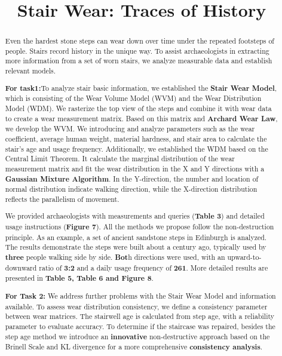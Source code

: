 \documentclass[12pt]{article}  %
\title{Stair Wear: Traces of History}  %
\numberwithin{equation}{section} %
\begin{document}
\begin{abstract}
	Even the hardest stone steps can wear down over time under the repeated footsteps of people. Stairs record history in the unique way. To assist archaeologists in extracting more information from a set of worn stairs, we analyze measurable data and establish relevant models.
	        
    \textbf{For task1:}To analyze stair basic information, we established the \textbf{Stair Wear Model}, which is consisting of the Wear Volume Model (WVM) and the Wear Distribution Model (WDM). We rasterize the top view of the steps and combine it with wear data to create a wear measurement matrix. Based on this matrix and \textbf{Archard Wear Law}, we develop the WVM. We introducing and analyze parameters such as the wear coefficient, average human weight, material hardness, and stair area to calculate the stair's age and usage frequency. Additionally, we established the WDM based on the Central Limit Theorem. It calculate the marginal distribution of the wear measurement matrix and fit the wear distribution in the X and Y directions with a \textbf{Gaussian Mixture Algorithm}. In the Y-direction, the number and location of normal distribution indicate walking direction, while the X-direction distribution reflects the parallelism of movement.

    We provided archaeologists with measurements and queries (\textbf{Table 3}) and detailed usage instructions (\textbf{Figure 7}). All the methods we propose follow the non-destruction principle. As an example, a set of ancient sandstone steps in Edinburgh is analyzed. The results demonstrate the steps were built about a century ago, typically used by \textbf{three} people walking side by side. \textbf{Bot}h directions were used, with an upward-to-downward ratio of \textbf{3:2} and a daily usage frequency of \textbf{261}. More detailed results are presented in \textbf{Table 5, Table 6 and Figure 8}.

    \textbf{For Task 2:} We address further problems with the Stair Wear Model and information available. To assess wear distribution consistency, we define a consistency parameter between wear matrices. The stairwell age is calculated from step age, with a reliability parameter to evaluate accuracy. To determine if the staircase was repaired, besides the step age method we introduce an \textbf{innovative} non-destructive approach based on the Brinell Scale and KL divergence for a more comprehensive \textbf{consistency analysis}.


\end{abstract}
\end{document}
